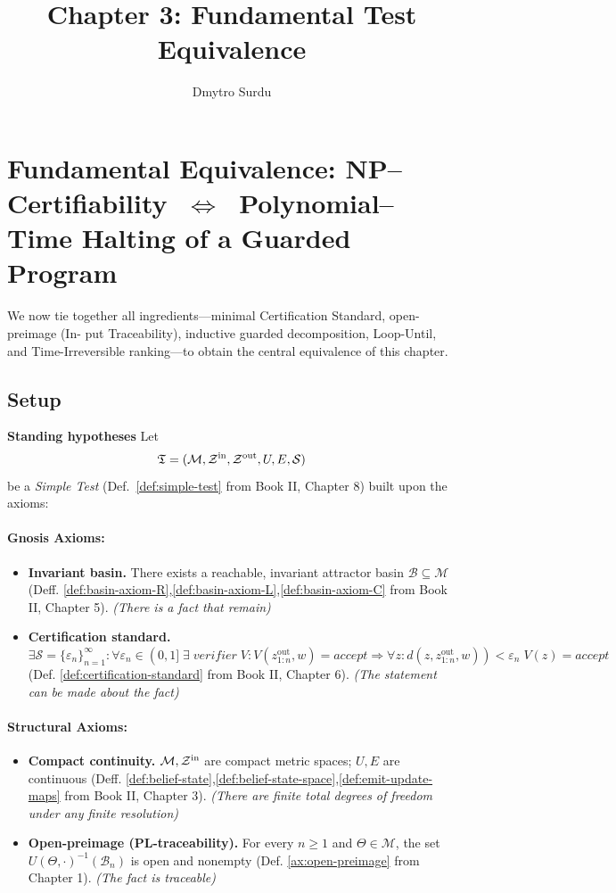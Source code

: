 \documentclass[12pt]{article}
\title{\textbf{Chapter 3: Fundamental Test Equivalence}}
\author{Dmytro Surdu}
\theoremstyle{definition}
\theoremstyle{plain}
\begin{document}
\maketitle

\section{Fundamental Equivalence: NP–Certifiability $\;\Longleftrightarrow\;$ Polynomial–Time Halting of a Guarded Program}
\label{sec:fundamental-equivalence-clean}

We now tie together all ingredients—minimal Certification Standard, open-preimage (In-
put Traceability), inductive guarded decomposition, Loop-Until, and Time-Irreversible ranking—to obtain
the central equivalence of this chapter.

\medskip
\subsection{Setup}
\noindent\textbf{Standing hypotheses}  
Let 
\[
  \mathfrak T=(\mathcal M,\mathcal Z^{\rm in},\mathcal Z^{\rm out},U,E,\mathcal S)
\]
be a \emph{Simple Test} (Def.~\ref{def:simple-test} from Book II, Chapter 8) built upon the axioms:
\paragraph{Gnosis Axioms:}
\begin{itemize}
  \item[(F)] \textbf{Invariant basin.} There exists a reachable, invariant attractor basin $\mathcal B\subseteq\mathcal M$ (Deff. \ref{def:basin-axiom-R},\ref{def:basin-axiom-L},\ref{def:basin-axiom-C} from Book II, Chapter 5). \emph{(There is a fact that remain)}
  \item[(S)] \textbf{Certification  standard.} $\exists \mathcal{S} = \{\varepsilon_n\}_{n=1}^\infty: \forall \varepsilon_n \in (0, 1]\; \exists\; verifier \; V: V(z^{\text{out}}_{1:n}, w)=accept \Longrightarrow \forall z: d(z,z^{\text{out}}_{1:n}, w))<\varepsilon_n\; V(z)=accept$ (Def. \ref{def:certification-standard} from Book II, Chapter 6). \emph{(The statement can be made about the fact)} 
\end{itemize}
\paragraph{Structural Axioms:}
\begin{itemize}
    \item[(C)] \textbf{Compact continuity.} $\mathcal M,\mathcal Z^{\rm in}$ are compact metric spaces; $U,E$ are continuous (Deff. \ref{def:belief-state},\ref{def:belief-state-space},\ref{def:emit-update-maps} from Book II, Chapter 3). \emph{(There are finite total degrees of freedom under any finite resolution)}
    \item[(T)] \textbf{Open‑preimage (PL-traceability).} For every $n\ge1$ and $\Theta\in\mathcal M$, the set $U(\Theta,\cdot)^{-1}(\mathcal B_n)$ is open and nonempty (Def. \ref{ax:open-preimage} from Chapter 1). \emph{(The fact is traceable)}
\end{itemize}
\end{document}
